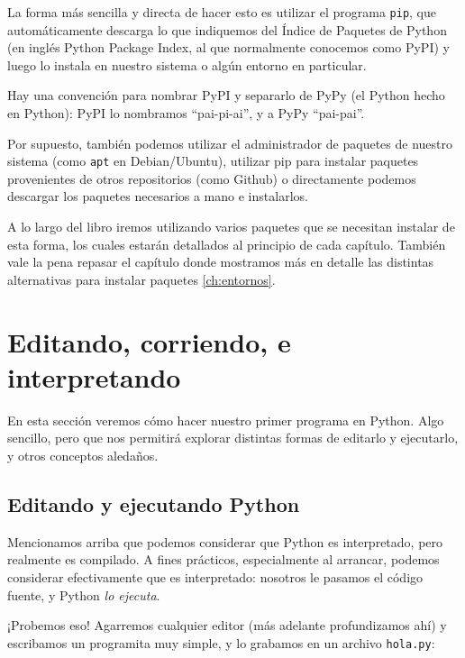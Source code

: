 La forma más sencilla y directa de hacer esto es utilizar el programa \texttt{pip}, que automáticamente descarga lo que indiquemos del Índice de Paquetes de Python (en inglés Python Package Index, al que normalmente conocemos como PyPI) y luego lo instala en nuestro sistema o algún entorno en particular.

\begin{info}
Hay una convención para nombrar PyPI y separarlo de PyPy (el Python hecho en Python): PyPI lo nombramos ``pai-pi-ai'', y a PyPy ``pai-pai''.
\end{info}

Por supuesto, también podemos utilizar el administrador de paquetes de nuestro sistema (como \texttt{apt} en Debian/Ubuntu), utilizar pip para instalar paquetes provenientes de otros repositorios (como Github) o directamente podemos descargar los paquetes necesarios a mano e instalarlos.

A lo largo del libro iremos utilizando varios paquetes que se necesitan instalar de esta forma, los cuales estarán detallados al principio de cada capítulo. También vale la pena repasar el capítulo donde mostramos más en detalle las distintas alternativas para instalar paquetes \ref{ch:entornos}.



\section{Editando, corriendo, e interpretando}

En esta sección veremos cómo hacer nuestro primer programa en Python. Algo sencillo, pero que nos permitirá explorar distintas formas de editarlo y ejecutarlo, y otros conceptos aledaños.


\subsection{Editando y ejecutando Python}

Mencionamos arriba que podemos considerar que Python es interpretado, pero realmente es compilado. A fines prácticos, especialmente al arrancar, podemos considerar efectivamente que es interpretado: nosotros le pasamos el código fuente, y Python \textit{lo ejecuta}.

¡Probemos eso! Agarremos cualquier editor (más adelante profundizamos ahí) y escribamos un programita muy simple, y lo grabamos en un archivo \texttt{hola.py}:


